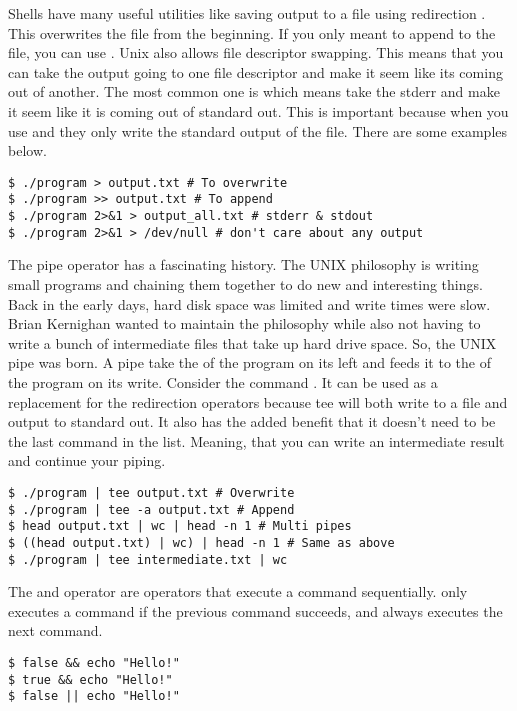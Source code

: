 Shells have many useful utilities like saving output to a file using redirection \keyword{>}. This overwrites the file from the beginning. If you only meant to append to the file, you can use \keyword{>>}. Unix also allows file descriptor swapping. This means that you can take the output going to one file descriptor and make it seem like its coming out of another. The most common one is  which means take the stderr and make it seem like it is coming out of standard out. This is important because when you use \keyword{>} and \keyword{>>} they only write the standard output of the file. There are some examples below.

\begin{lstlisting}[language=console]
$ ./program > output.txt # To overwrite
$ ./program >> output.txt # To append
$ ./program 2>&1 > output_all.txt # stderr & stdout
$ ./program 2>&1 > /dev/null # don't care about any output
\end{lstlisting}

The pipe operator has a fascinating history. The UNIX philosophy is writing small programs and chaining them together to do new and interesting things. Back in the early days, hard disk space was limited and write times were slow. Brian Kernighan wanted to maintain the philosophy while also not having to write a bunch of intermediate files that take up hard drive space. So, the UNIX pipe was born. A pipe take the  of the program on its left and feeds it to the  of the program on its write. Consider the command . It can be used as a replacement for the redirection operators because tee will both write to a file and output to standard out. It also has the added benefit that it doesn't need to be the last command in the list. Meaning, that you can write an intermediate result and continue your piping.

\begin{lstlisting}[language=console]
$ ./program | tee output.txt # Overwrite
$ ./program | tee -a output.txt # Append
$ head output.txt | wc | head -n 1 # Multi pipes
$ ((head output.txt) | wc) | head -n 1 # Same as above
$ ./program | tee intermediate.txt | wc
\end{lstlisting}

The \keyword{&&} and \keyword{||} operator are operators that execute a command sequentially. \keyword{&&} only executes a command if the previous command succeeds, and \keyword{||} always executes the next command.

\begin{lstlisting}[language=console]
$ false && echo "Hello!"
$ true && echo "Hello!"
$ false || echo "Hello!"
\end{lstlisting}


